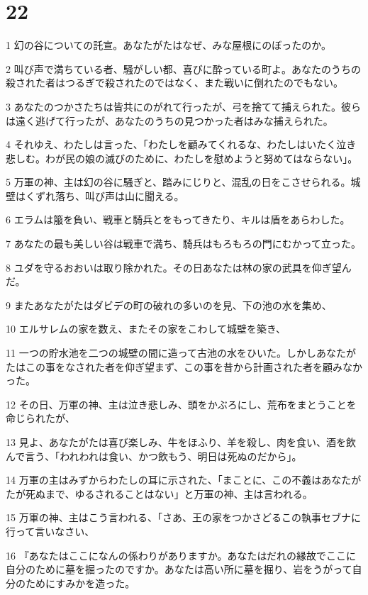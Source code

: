 \chapter{22}

\par 1 幻の谷についての託宣。あなたがたはなぜ、みな屋根にのぼったのか。
\par 2 叫び声で満ちている者、騒がしい都、喜びに酔っている町よ。あなたのうちの殺された者はつるぎで殺されたのではなく、また戦いに倒れたのでもない。
\par 3 あなたのつかさたちは皆共にのがれて行ったが、弓を捨てて捕えられた。彼らは遠く逃げて行ったが、あなたのうちの見つかった者はみな捕えられた。
\par 4 それゆえ、わたしは言った、「わたしを顧みてくれるな、わたしはいたく泣き悲しむ。わが民の娘の滅びのために、わたしを慰めようと努めてはならない」。
\par 5 万軍の神、主は幻の谷に騒ぎと、踏みにじりと、混乱の日をこさせられる。城壁はくずれ落ち、叫び声は山に聞える。
\par 6 エラムは箙を負い、戦車と騎兵とをもってきたり、キルは盾をあらわした。
\par 7 あなたの最も美しい谷は戦車で満ち、騎兵はもろもろの門にむかって立った。
\par 8 ユダを守るおおいは取り除かれた。その日あなたは林の家の武具を仰ぎ望んだ。
\par 9 またあなたがたはダビデの町の破れの多いのを見、下の池の水を集め、
\par 10 エルサレムの家を数え、またその家をこわして城壁を築き、
\par 11 一つの貯水池を二つの城壁の間に造って古池の水をひいた。しかしあなたがたはこの事をなされた者を仰ぎ望まず、この事を昔から計画された者を顧みなかった。
\par 12 その日、万軍の神、主は泣き悲しみ、頭をかぶろにし、荒布をまとうことを命じられたが、
\par 13 見よ、あなたがたは喜び楽しみ、牛をほふり、羊を殺し、肉を食い、酒を飲んで言う、「われわれは食い、かつ飲もう、明日は死ぬのだから」。
\par 14 万軍の主はみずからわたしの耳に示された、「まことに、この不義はあなたがたが死ぬまで、ゆるされることはない」と万軍の神、主は言われる。
\par 15 万軍の神、主はこう言われる、「さあ、王の家をつかさどるこの執事セブナに行って言いなさい、
\par 16 『あなたはここになんの係わりがありますか。あなたはだれの縁故でここに自分のために墓を掘ったのですか。あなたは高い所に墓を掘り、岩をうがって自分のためにすみかを造った。
